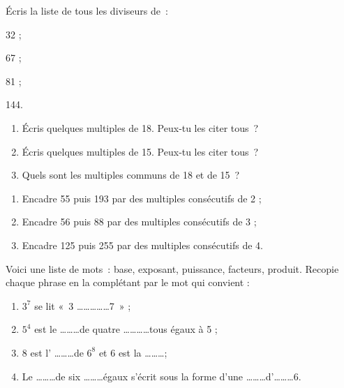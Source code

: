 \begin{exercice}
Écris la liste de tous les diviseurs de :
\begin{colenumerate}{4}
 \item 32 ;
 \item 67 ;
 \item 81 ;
 \item 144.
 \end{colenumerate}
\end{exercice} 

\begin{exercice}
\begin{enumerate}
 \item Écris quelques multiples de 18. Peux‑tu les citer tous ?
 \item Écris quelques multiples de 15. Peux‑tu les citer tous ?
 \item Quels sont les multiples communs de 18 et de 15 ?
 \end{enumerate}
\end{exercice} 

\begin{exercice}[Encadrement]
\begin{enumerate}
 \item Encadre 55 puis 193 par des multiples consécutifs de 2 ;
 \item Encadre 56 puis 88 par des multiples consécutifs de 3 ;
 \item Encadre 125 puis 255 par des multiples consécutifs de 4.
 \end{enumerate}
\end{exercice} 

\begin{exercice}[Vocabulaire]
Voici une liste de mots : base, exposant, puissance, facteurs, produit. Recopie chaque phrase en la complétant par le mot qui convient :
\begin{enumerate}
 \item $3^7$ se lit « 3 \ldots \ldots \ldots \ldots \ldots 7 » ;
 \item $5^4$ est le \ldots \ldots \ldots de quatre \ldots \ldots \ldots \ldots tous égaux à 5 ;
 \item 8 est l' \ldots \ldots \ldots de $6^8$ et 6 est la \ldots \ldots \ldots ;
 \item Le \ldots \ldots \ldots de six \ldots \ldots \ldots égaux s'écrit sous la forme d'une \ldots \ldots \ldots d'\ldots \ldots \ldots 6.
 \end{enumerate}
\end{exercice} 

